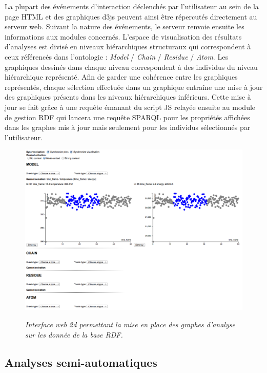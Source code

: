 La plupart des événements d'interaction déclenchés par l'utilisateur au sein de la page HTML et des graphiques d3js peuvent ainsi être répercutés directement au serveur web. Suivant la nature des événements, le serveur renvoie ensuite les informations aux modules concernés.
L'espace de visualisation des résultats d'analyses est divisé en niveaux hiérarchiques structuraux qui correspondent à ceux référencés dans l'ontologie : \textit{Model} / \textit{Chain} / \textit{Residue} / \textit{Atom}. Les graphiques dessinés dans chaque niveau correspondent à des individus du niveau hiérarchique représenté. Afin de garder une cohérence entre les graphiques représentés, chaque sélection effectuée dans un graphique entraîne une mise à jour des graphiques présents dans les niveaux hiérarchiques inférieurs. Cette mise à jour se fait grâce à une requête émanant du script JS relayée ensuite au module de gestion RDF qui lancera une requête SPARQL pour les propriétés affichées dans les graphes mis à jour mais seulement pour les individus sélectionnés par l'utilisateur.

\begin{figure}
  \centering
  {\includegraphics[width=1.0\linewidth]{./figures/ch5/2d_interface}}
    \caption[Interface web 2d pour la visualisation de graphes d'analyses.]{{\it Interface web 2d permettant la mise en place des graphes d'analyse sur les donnée de la base RDF.}}
  \label{Fig:multi_collaboratif}
  \hspace{0.3cm}
\end{figure}

\subsection{Analyses semi-automatiques}

